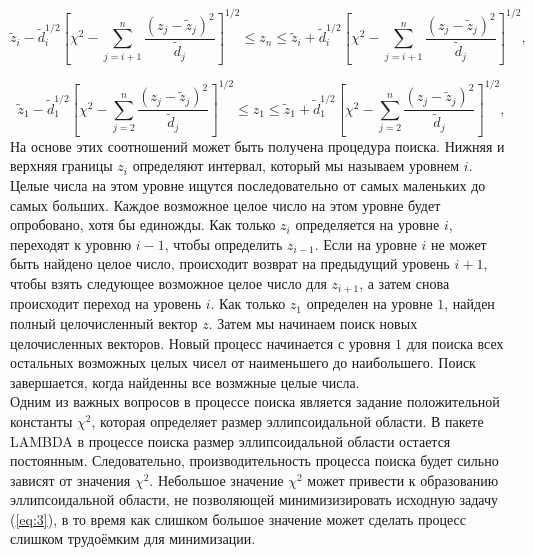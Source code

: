 \documentclass[12pt]{matmex-diploma}
\begin{document}
\begin{center}
\text{\vdots}
\end{center}
\begin{equation}
     \tilde{z}_i - \tilde{d}^{1/2}_i \left[{ \chi^2 - \sum^{n}_{j=i+1}{\frac{(z_j - \tilde{z}_j)^2}{\tilde{d}_j}}}\right]^{1/2} \leq
     z_n \leq
     \tilde{z}_i + \tilde{d}^{1/2}_i \left[{ \chi^2 - \sum^{n}_{j=i+1}{\frac{(z_j - \tilde{z}_j)^2}{\tilde{d}_j}}}\right]^{1/2},
     \label{eq:23}
\end{equation}
\begin{center}
\text{\vdots}
\end{center}
\begin{equation}
     \tilde{z}_1 - \tilde{d}^{1/2}_1 \left[{ \chi^2 - \sum^{n}_{j=2}{\frac{(z_j - \tilde{z}_j)^2}{\tilde{d}_j}}}\right]^{1/2} \leq
     z_1 \leq
     \tilde{z}_1 + \tilde{d}^{1/2}_1 \left[{ \chi^2 - \sum^{n}_{j=2}{\frac{(z_j - \tilde{z}_j)^2}{\tilde{d}_j}}}\right]^{1/2},
     \label{eq:24}
\end{equation}
На основе этих соотношений может быть получена процедура поиска. Нижняя и верхняя
границы $z_i$ определяют интервал, который мы называем уровнем $i$.
Целые числа на этом уровне ищутся последовательно от самых маленьких до самых
больших. Каждое возможное целое число на этом уровне будет опробовано, хотя бы
единожды. Как только $z_i$ определяется на уровне $i$, переходят к уровню $i-1$,
чтобы определить $z_{i − 1}$. Если на уровне $i$ не может быть найдено целое число,
происходит возврат на предыдущий уровень $i + 1$, чтобы взять следующее возможное
целое число для $z_{i + 1}$, а затем снова происходит переход на уровень $i$. 
Как только $z_1$ определен на уровне $1$, найден полный целочисленный вектор $z$.
Затем мы начинаем поиск новых целочисленных векторов. Новый процесс начинается с
уровня $1$ для поиска всех остальных возможных целых чисел от наименьшего до
наибольшего. Поиск завершается, когда найденны все возмжные целые числа.\\
Одним из важных вопросов в процессе поиска является задание положительной константы $\chi^2$,
которая определяет размер эллипсоидальной области. В пакете LAMBDA в процессе
поиска размер эллипсоидальной области остается постоянным. Следовательно,
производительность процесса поиска будет сильно зависят от значения $\chi^2$.
Небольшое значение $\chi^2$ может привести к образованию эллипсоидальной области,
не позволяющей минимизизировать исходную задачу (\ref{eq:3}), в то время как 
слишком большое значение может сделать процесс слишком трудоёмким для минимизации.
\end{document}
